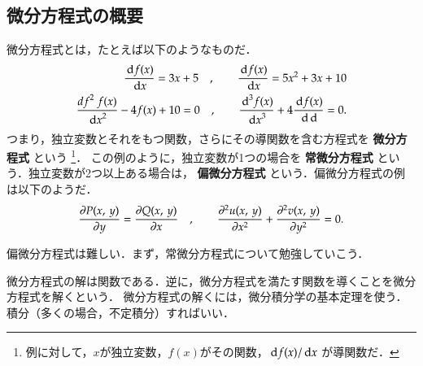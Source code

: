 ﻿%
            \subsection{微分方程式の概要}
                微分方程式とは，たとえば以下のようなものだ．
                    \begin{align*}
                        \frac{\,\mathrm{d} f(x)}{\,\mathrm{d} x} = 3x + 5
                        \quad , \qquad \frac{\,\mathrm{d} f(x)}{\,\mathrm{d} x} = 5{x}^{2} + 3x + 10 \\
                        \frac{{df}^{2}\ f(x)}{{\,\mathrm{d} x}^{2}} - 4f(x) + 10 = 0
                        \quad , \qquad \frac{{\,\mathrm{d}}^{3} f(x)}{{\,\mathrm{d} x}^{3}} + 4\frac{\,\mathrm{d} f(x)}{\,\mathrm{d} \,\mathrm{d}} = 0. 
                    \end{align*}
                つまり，独立変数とそれをもつ関数，さらにその導関数を含む方程式を \textbf{微分方程式} という
                    \footnote{
                        例に対して，$x$が独立変数，$f(x)$がその関数，$\,\mathrm{d} f(x)/\,\mathrm{d} x$ が導関数だ．
                    }．
                この例のように，独立変数が1つの場合を \textbf{常微分方程式} という．独立変数が2つ以上ある場合は，
                \textbf{偏微分方程式} という．偏微分方程式の例は以下のようだ．
                    \[
                        \frac{\partial P(x,\,y)}{\partial y} = \frac{\partial Q(x,\,y)}{\partial x}
                        \quad , \qquad \frac{{\partial}^{2} u(x,\,y)}{\partial {x}^{2}} + \frac{{\partial}^{2} v(x,\,y)}{\partial {y}^{2}} = 0.
                    \]
                
                偏微分方程式は難しい．まず，常微分方程式について勉強していこう．

                微分方程式の解は関数である．逆に，微分方程式を満たす関数を導くことを微分方程式を解くという．
                微分方程式の解くには，微分積分学の基本定理を使う．積分（多くの場合，不定積分）すればいい．

